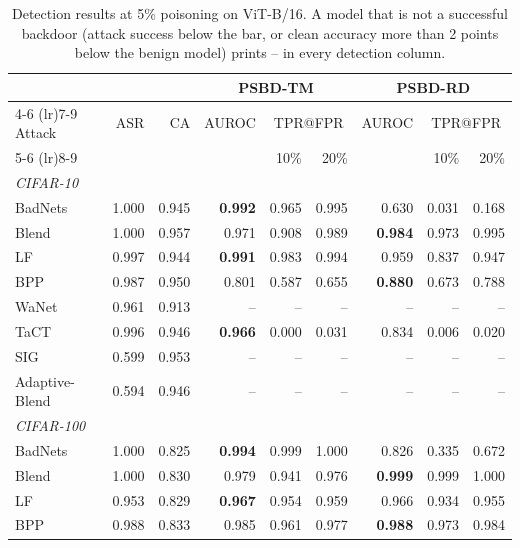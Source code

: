 \begin{table}[htbp]
\centering
\small
\setlength{\tabcolsep}{4pt}
\caption{Detection results at 5\% poisoning on ViT-B/16. A model that is not a successful backdoor (attack success below the bar, or clean accuracy more than 2 points below the benign model) prints -- in every detection column.}
\label{tab:results-rate-5}
\begin{tabular}{lrrrrrrrr}
\toprule
 & & & \multicolumn{3}{c}{PSBD-TM} & \multicolumn{3}{c}{PSBD-RD} \\
\cmidrule(lr){4-6} \cmidrule(lr){7-9}
Attack & ASR & CA & AUROC & \multicolumn{2}{c}{TPR@FPR} & AUROC & \multicolumn{2}{c}{TPR@FPR} \\
\cmidrule(lr){5-6} \cmidrule(lr){8-9}
 & & & & 10\% & 20\% & & 10\% & 20\% \\
\midrule
\multicolumn{9}{l}{\textit{CIFAR-10}} \\
BadNets & 1.000 & 0.945 & \textbf{0.992} & 0.965 & 0.995 & 0.630 & 0.031 & 0.168 \\
Blend & 1.000 & 0.957 & 0.971 & 0.908 & 0.989 & \textbf{0.984} & 0.973 & 0.995 \\
LF & 0.997 & 0.944 & \textbf{0.991} & 0.983 & 0.994 & 0.959 & 0.837 & 0.947 \\
BPP & 0.987 & 0.950 & 0.801 & 0.587 & 0.655 & \textbf{0.880} & 0.673 & 0.788 \\
WaNet & 0.961 & 0.913 & -- & -- & -- & -- & -- & -- \\
TaCT & 0.996 & 0.946 & \textbf{0.966} & 0.000 & 0.031 & 0.834 & 0.006 & 0.020 \\
SIG & 0.599 & 0.953 & -- & -- & -- & -- & -- & -- \\
Adaptive-Blend & 0.594 & 0.946 & -- & -- & -- & -- & -- & -- \\
\midrule
\multicolumn{9}{l}{\textit{CIFAR-100}} \\
BadNets & 1.000 & 0.825 & \textbf{0.994} & 0.999 & 1.000 & 0.826 & 0.335 & 0.672 \\
Blend & 1.000 & 0.830 & 0.979 & 0.941 & 0.976 & \textbf{0.999} & 0.999 & 1.000 \\
LF & 0.953 & 0.829 & \textbf{0.967} & 0.954 & 0.959 & 0.966 & 0.934 & 0.955 \\
BPP & 0.988 & 0.833 & 0.985 & 0.961 & 0.977 & \textbf{0.988} & 0.973 & 0.984 \\

\end{tabular}
\end{table}
